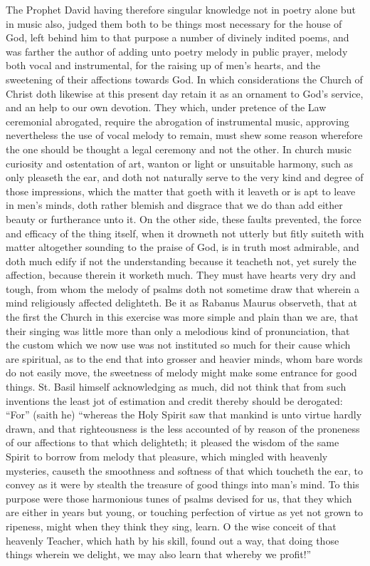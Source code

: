 The Prophet David having therefore singular knowledge not in poetry alone but in music also, judged them both to be things most necessary for the house of God, left behind him to that purpose a number of divinely indited poems, and was farther the author of adding unto poetry melody in public prayer, melody both vocal and instrumental, for the raising up of men’s hearts, and the sweetening of their affections towards God. In which considerations the Church of Christ doth likewise at this present day retain it as an ornament to God’s service, and an help to our own  devotion. They which, under pretence of the Law ceremonial abrogated, require the abrogation of instrumental music, approving nevertheless the use of vocal melody to remain, must shew some reason wherefore the one should be thought a legal ceremony and not the other.
In church music curiosity and ostentation of art, wanton or light or unsuitable harmony, such as only pleaseth the ear, and doth not naturally serve to the very kind and degree of those impressions, which the matter that goeth with it leaveth or is apt to leave in men’s minds, doth rather blemish and disgrace that we do than add either beauty or furtherance unto it. On the other side, these faults prevented, the force and efficacy of the thing itself, when it drowneth not utterly but fitly suiteth with matter altogether sounding to the praise of God, is in truth most admirable, and doth much edify if not the understanding because it teacheth not, yet surely the affection, because therein it worketh much. They must  have hearts very dry and tough, from whom the melody of psalms doth not sometime draw that wherein a mind religiously affected delighteth. Be it as Rabanus Maurus observeth, that at the first the Church in this exercise was more simple and plain than we are, that their singing was little more than only a melodious kind of pronunciation, that the custom which we now use was not instituted so much for their cause which are spiritual, as to the end that into grosser and heavier minds, whom bare words do not easily move, the sweetness of melody might make some entrance for good things. St. Basil himself acknowledging as much, did not think that from such inventions the least jot of estimation and credit thereby should be derogated: “For” (saith he) “whereas the Holy Spirit saw that mankind is unto virtue hardly drawn, and that righteousness is the less accounted of by reason of the proneness of our affections to that which delighteth; it pleased the wisdom of the same Spirit to borrow from melody that pleasure, which mingled with heavenly mysteries, causeth the smoothness and softness of that which toucheth the ear, to convey as it were by stealth the treasure of good things into man’s mind. To this purpose were those harmonious tunes of psalms devised for us, that they which are either in years but young, or touching perfection of virtue as yet not grown to ripeness, might when they think they sing, learn. O the wise conceit of that heavenly Teacher, which hath by his skill, found out a way, that doing those things wherein we delight, we may also learn that whereby we profit!”

